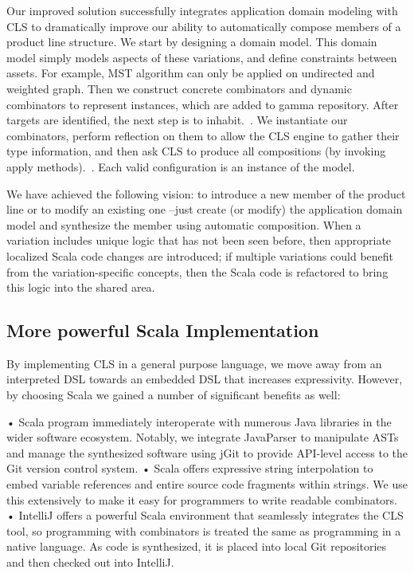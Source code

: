 
Our improved solution successfully integrates application domain modeling with CLS to dramatically improve our
ability to automatically compose members of a product line structure. We start by designing a domain model.
This domain model simply models aspects of these variations, and define constraints between assets. For example,
MST algorithm can only be applied on undirected and weighted graph. Then we construct concrete combinators and dynamic
combinators to represent instances, which are added to gamma repository. After targets are identified, the next step
is to inhabit.~\cite{Ddder2013UsingII}. We instantiate our combinators, perform reflection on them to allow the CLS engine to gather their type
information, and then ask CLS to produce all compositions (by invoking apply methods).~\cite{Heineman:2015:TMO:2791060.2791076}.
Each valid configuration is an instance of the model.

We have achieved the following vision: to introduce a new member of the product line or to modify an
existing one –just create (or modify) the application domain model and synthesize the member using
automatic composition. When a variation includes unique logic that has not been seen before, then appropriate
 localized Scala code changes are introduced; if multiple variations could benefit from the variation-specific concepts,
  then the Scala code is refactored to bring this logic into the shared area.

 \subsection{More powerful Scala Implementation}

 By implementing CLS in a general purpose language, we move away from an interpreted DSL towards an embedded DSL
 that increases expressivity. However, by choosing Scala we gained a number of significant benefits as well:

 • Scala program immediately interoperate with numerous Java libraries in the wider software ecosystem. Notably,
 we integrate JavaParser to manipulate ASTs and manage the synthesized software using jGit to
 provide API-level access to the Git version control system.
 • Scala offers expressive string interpolation to embed variable references and entire source code fragments within strings.
 We use this extensively to make it easy for programmers to write readable combinators.
 • IntelliJ offers a powerful Scala environment that seamlessly integrates the CLS tool, so programming with
 combinators is treated the same as programming in a native language. As code is synthesized, it is placed
 into local Git repositories and then checked out into IntelliJ.

